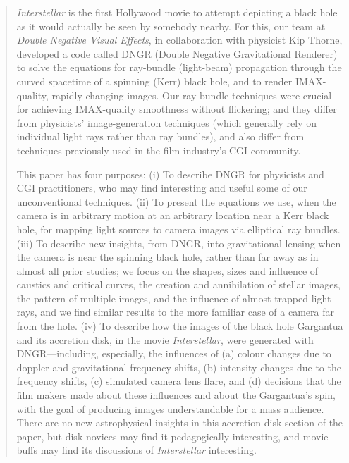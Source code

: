 \documentclass[12pt]{iopart}
\begin{document}
\begin{abstract}
\emph{Interstellar} is the first Hollywood movie to attempt depicting a black hole as it would actually be seen by somebody nearby.   For this, our team at \emph{Double Negative Visual Effects}, in collaboration with physicist Kip Thorne, developed a code called DNGR (Double Negative Gravitational Renderer) to solve the  equations for ray-bundle (light-beam) propagation through the curved spacetime of a spinning (Kerr) black hole, and to render IMAX-quality, rapidly changing images.    Our ray-bundle techniques  were crucial for achieving IMAX-quality smoothness without flickering; and they differ from physicists' image-generation techniques (which generally rely on individual light rays rather than ray bundles), and also differ from techniques previously used in the film
industry's CGI community.

This paper has four purposes:  (i) To describe DNGR for physicists and CGI practitioners, who may find interesting and useful some of our unconventional techniques. (ii) To present  the equations we use, when the camera is in arbitrary motion at an arbitrary location near a Kerr black hole, for mapping light sources to camera images via elliptical ray bundles.    (iii) To describe new insights,
from DNGR, into gravitational lensing when the camera is near the spinning 
black hole, rather than far away as in almost all prior studies; we focus 
on the shapes, sizes and influence of caustics and critical curves, the 
creation and annihilation of stellar images, the pattern of multiple images, and the influence of 
almost-trapped light rays, and we find similar results to the more familiar
case of a camera far from the hole. (iv) To describe how the images of the black hole Gargantua and its accretion disk, in the movie \emph{Interstellar}, were generated with DNGR---including, especially, the influences of (a) colour changes due to doppler and gravitational frequency shifts, (b) intensity changes due to the frequency shifts, (c) simulated camera lens flare, and (d) decisions that the film makers made about these influences and about the Gargantua's spin, with the goal of  producing images understandable for a mass audience.  There are no new astrophysical insights in this accretion-disk section of the paper, but disk novices may find it pedagogically interesting, and movie buffs may find its discussions of \emph{Interstellar} interesting.




\end{abstract}
\end{document}
